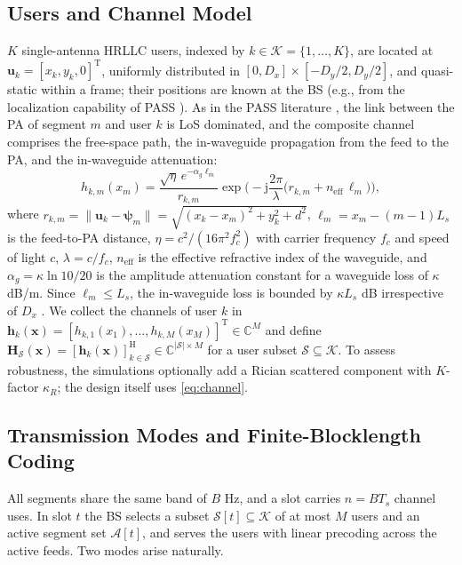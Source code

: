 \documentclass[journal]{IEEEtran}
\newcommand{\C}{\mathbb{C}}
\newcommand{\vect}[1]{\bm{#1}}
\newcommand{\Sset}{\mathcal{S}}
\newcommand{\Kset}{\mathcal{K}}
\newcommand{\neff}{n_{\mathrm{eff}}}
\begin{document}
\subsection{Users and Channel Model}
$K$ single-antenna HRLLC users, indexed by $k\in\Kset=\{1,\dots,K\}$, are located at $\vect{u}_k=[x_k,y_k,0]^{\mathrm T}$, uniformly distributed in $[0,D_x]\times[-D_y/2,D_y/2]$, and quasi-static within a frame; their positions are known at the BS (e.g., from the localization capability of PASS \cite{Shan2026SWANAccess}). As in the PASS literature \cite{Ding2025FlexibleAntenna,Ouyang2026SWAN}, the link between the PA of segment $m$ and user $k$ is LoS dominated, and the composite channel comprises the free-space path, the in-waveguide propagation from the feed to the PA, and the in-waveguide attenuation:
\begin{equation}\label{eq:channel}
h_{k,m}(x_m)=\frac{\sqrt{\eta}\,e^{-\alpha_g \ell_m}}{r_{k,m}}\exp\!\Big(-\mathrm j\frac{2\pi}{\lambda}\big(r_{k,m}+\neff\,\ell_m\big)\Big),
\end{equation}
where $r_{k,m}=\|\vect u_k-\vect\psi_m\|=\sqrt{(x_k-x_m)^2+y_k^2+d^2}$, $\ell_m=x_m-(m-1)L_s$ is the feed-to-PA distance, $\eta=c^2/(16\pi^2 f_c^2)$ with carrier frequency $f_c$ and speed of light $c$, $\lambda=c/f_c$, $\neff$ is the effective refractive index of the waveguide, and $\alpha_g=\kappa\ln 10/20$ is the amplitude attenuation constant for a waveguide loss of $\kappa$ dB/m. Since $\ell_m\le L_s$, the in-waveguide loss is bounded by $\kappa L_s$ dB irrespective of $D_x$ \cite{Ouyang2026SWAN}. We collect the channels of user $k$ in $\vect h_k(\vect x)=[h_{k,1}(x_1),\dots,h_{k,M}(x_M)]^{\mathrm T}\in\C^{M}$ and define $\vect H_{\Sset}(\vect x)=[\vect h_k(\vect x)]_{k\in\Sset}^{\mathrm H}\in\C^{|\Sset|\times M}$ for a user subset $\Sset\subseteq\Kset$. To assess robustness, the simulations optionally add a Rician scattered component with $K$-factor $\kappa_R$; the design itself uses \eqref{eq:channel}.

\subsection{Transmission Modes and Finite-Blocklength Coding}
All segments share the same band of $B$ Hz, and a slot carries $n=BT_s$ channel uses. In slot $t$ the BS selects a subset $\Sset[t]\subseteq\Kset$ of at most $M$ users and an active segment set $\mathcal A[t]$, and serves the users with linear precoding across the active feeds. Two modes arise naturally.
\end{document}
